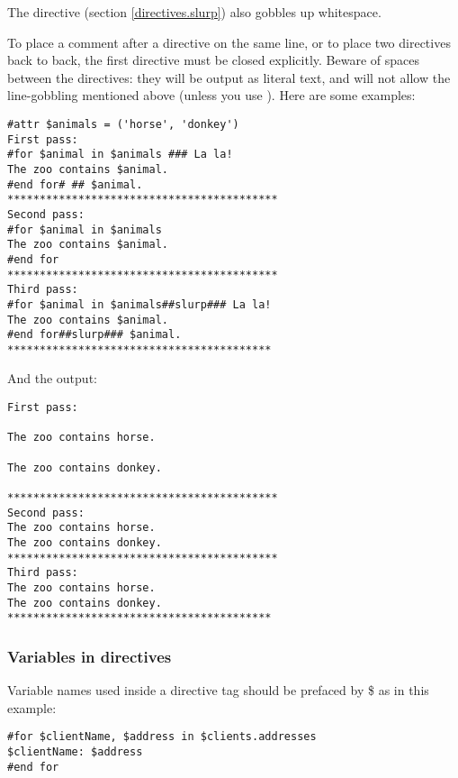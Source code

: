 The  directive (section
\ref{directives.slurp}) also gobbles up whitespace.

To place a comment after a directive on the same line, or to place two
directives back to back, the first directive must be closed explicitly.
Beware of spaces between the directives: they will be output as literal text,
and will not allow the line-gobbling mentioned above (unless you use
).  Here are some examples:

\begin{verbatim}
#attr $animals = ('horse', 'donkey')
First pass:
#for $animal in $animals ### La la!
The zoo contains $animal.
#end for# ## $animal.
******************************************
Second pass:
#for $animal in $animals
The zoo contains $animal.
#end for
******************************************
Third pass:
#for $animal in $animals##slurp### La la!
The zoo contains $animal.
#end for##slurp### $animal.
*****************************************
\end{verbatim}

And the output:

\begin{verbatim}
First pass:

The zoo contains horse.

The zoo contains donkey.
 
******************************************
Second pass:
The zoo contains horse.
The zoo contains donkey.
******************************************
Third pass:
The zoo contains horse.
The zoo contains donkey.
*****************************************

\end{verbatim}



\subsubsection{Variables in directives}
\label{language.directives.variables}

Variable names used inside a directive tag should be prefaced by \$ as in this
example:

\begin{verbatim}
#for $clientName, $address in $clients.addresses
$clientName: $address
#end for
\end{verbatim}


